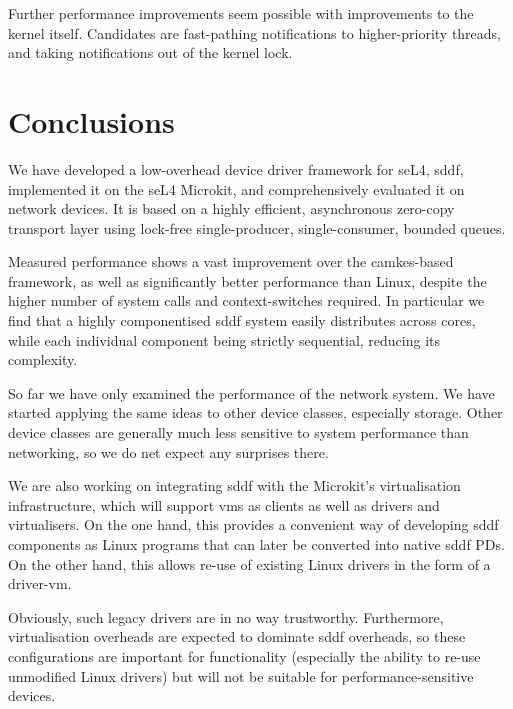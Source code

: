 \documentclass[a4paper,12pt]{report}
\begin{document}
Further performance improvements seem possible with improvements to
the kernel itself. Candidates are fast-pathing notifications to
higher-priority threads, and taking notifications out of the kernel lock.


\chapter{Conclusions}

We have developed a low-overhead device driver
framework for seL4, \gls{sddf}, implemented it on the seL4 Microkit, and
comprehensively evaluated it on network devices. It is based
on a highly efficient, asynchronous zero-copy transport layer using
lock-free single-producer, single-consumer, bounded queues.

Measured performance shows a vast improvement over the
\gls{camkes}-based framework, as well as significantly better performance than
Linux, despite the higher number of system calls and context-switches
required. In particular we find that a highly componentised \gls{sddf}
system easily distributes across cores, while each individual
component being strictly sequential, reducing its complexity.

So far we have only examined the performance of the network system. We
have started applying the same ideas to other device classes,
especially storage. Other device classes are generally much less
sensitive to system performance than networking, so we do net expect
any surprises there.

We are also working on integrating \gls{sddf} with the Microkit's
virtualisation infrastructure, which will support \glspl{vm} as clients as
well as drivers and virtualisers. On the one hand, this provides a
convenient way of developing \gls{sddf} components as Linux programs that
can later be converted into native \gls{sddf} PDs. On the other hand, this
allows re-use of existing Linux drivers in the form of a driver-\gls{vm}.

Obviously, such legacy drivers are in no way trustworthy. Furthermore,
virtualisation overheads are expected to dominate
\gls{sddf} overheads, so these configurations are important for
functionality (especially the ability to re-use unmodified Linux
drivers) but will not be suitable for performance-sensitive
devices.




\appendix
\end{document}
